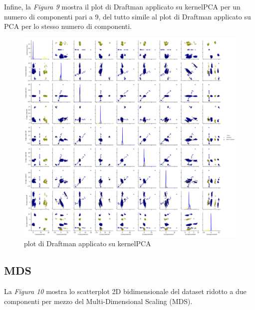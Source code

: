 \documentclass[11pt,a4paper,twocolumn]{article}
\begin{document}
	Infine, la \emph{Figura 9} mostra il plot di Draftman applicato su kernelPCA per un numero di componenti pari a 9, del tutto simile al plot di Draftman applicato su PCA per lo stesso numero di componenti. \par
	\begin{figure}[h]
		\centering
		\includegraphics[width=0.69\columnwidth, keepaspectratio]{img/kernelPCA_SPLOM.png}
		\caption{plot di Draftman applicato su kernelPCA}
	\end{figure}
\subsection{MDS}

	La \emph{Figura 10} mostra lo scatterplot 2D bidimensionale del dataset ridotto a due componenti per mezzo del Multi-Dimensional Scaling (MDS).
\end{document}
